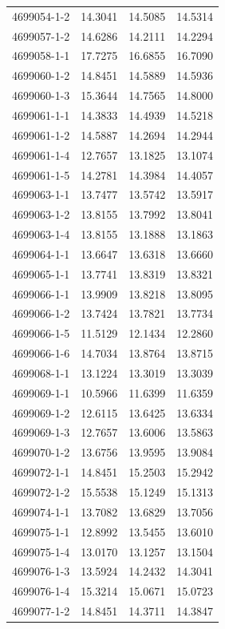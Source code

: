 \begin{longtable}{lrrr}
4699054-1-2 & 14.3041 & 14.5085 & 14.5314 \\
4699057-1-2 & 14.6286 & 14.2111 & 14.2294 \\
4699058-1-1 & 17.7275 & 16.6855 & 16.7090 \\
4699060-1-2 & 14.8451 & 14.5889 & 14.5936 \\
4699060-1-3 & 15.3644 & 14.7565 & 14.8000 \\
4699061-1-1 & 14.3833 & 14.4939 & 14.5218 \\
4699061-1-2 & 14.5887 & 14.2694 & 14.2944 \\
4699061-1-4 & 12.7657 & 13.1825 & 13.1074 \\
4699061-1-5 & 14.2781 & 14.3984 & 14.4057 \\
4699063-1-1 & 13.7477 & 13.5742 & 13.5917 \\
4699063-1-2 & 13.8155 & 13.7992 & 13.8041 \\
4699063-1-4 & 13.8155 & 13.1888 & 13.1863 \\
4699064-1-1 & 13.6647 & 13.6318 & 13.6660 \\
4699065-1-1 & 13.7741 & 13.8319 & 13.8321 \\
4699066-1-1 & 13.9909 & 13.8218 & 13.8095 \\
4699066-1-2 & 13.7424 & 13.7821 & 13.7734 \\
4699066-1-5 & 11.5129 & 12.1434 & 12.2860 \\
4699066-1-6 & 14.7034 & 13.8764 & 13.8715 \\
4699068-1-1 & 13.1224 & 13.3019 & 13.3039 \\
4699069-1-1 & 10.5966 & 11.6399 & 11.6359 \\
4699069-1-2 & 12.6115 & 13.6425 & 13.6334 \\
4699069-1-3 & 12.7657 & 13.6006 & 13.5863 \\
4699070-1-2 & 13.6756 & 13.9595 & 13.9084 \\
4699072-1-1 & 14.8451 & 15.2503 & 15.2942 \\
4699072-1-2 & 15.5538 & 15.1249 & 15.1313 \\
4699074-1-1 & 13.7082 & 13.6829 & 13.7056 \\
4699075-1-1 & 12.8992 & 13.5455 & 13.6010 \\
4699075-1-4 & 13.0170 & 13.1257 & 13.1504 \\
4699076-1-3 & 13.5924 & 14.2432 & 14.3041 \\
4699076-1-4 & 15.3214 & 15.0671 & 15.0723 \\
4699077-1-2 & 14.8451 & 14.3711 & 14.3847 \\

\end{longtable}
